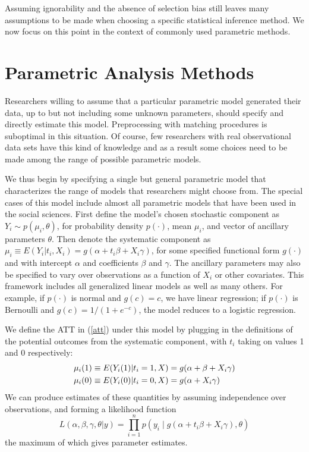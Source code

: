 \documentclass[11pt,titlepage]{article}
\begin{document}
Assuming ignorability and the absence of selection bias still leaves
many assumptions to be made when choosing a specific statistical
inference method.  We now focus on this point in the context of
commonly used parametric methods.

\section{Parametric Analysis Methods}

Researchers willing to assume that a particular parametric model
generated their data, up to but not including some unknown parameters,
should specify and directly estimate this model.  Preprocessing with
matching procedures is suboptimal in this situation.  Of course, few
researchers with real observational data sets have this kind of
knowledge and as a result some choices need to be made among the range
of possible parametric models.

We thus begin by specifying a single but general parametric model that
characterizes the range of models that researchers might choose from.
The special cases of this model include almost all parametric models
that have been used in the social sciences.  First define the model's
chosen stochastic component as $Y_i \sim p(\mu_i,\theta)$, for
probability density $p(\cdot)$, mean $\mu_i$, and vector of ancillary
parameters $\theta$.  Then denote the systematic component as
$\mu_i\equiv E(Y_i|t_i,X_i)=g(\alpha + t_i\beta + X_i\gamma)$, for
some specified functional form $g(\cdot)$ and with intercept $\alpha$
and coefficients $\beta$ and $\gamma$.  The ancillary parameters may
also be specified to vary over observations as a function of $X_i$ or
other covariates.  This framework includes all generalized linear
models \citep{McCNel89} as well as many others.  For example, if
$p(\cdot)$ is normal and $g(c)=c$, we have linear regression; if
$p(\cdot)$ is Bernoulli and $g(c)=1/(1+e^{-c})$, the model reduces to
a logistic regression.

We define the ATT in (\ref{att}) under this model by plugging in the
definitions of the potential outcomes from the systematic component,
with $t_i$ taking on values 1 and 0 respectively:
\begin{align}
  \label{matt}
\mu_i(1)&\equiv E(Y_i(1)|t_i=1,X)= g(\alpha + \beta + X_i\gamma)\notag \\
\mu_i(0)&\equiv E(Y_i(0)|t_i=0,X) = g(\alpha + X_i\gamma)
\end{align}
We can produce estimates of these quantities by assuming independence
over observations, and forming a likelihood function
\begin{equation}
  \label{lik}
  L(\alpha,\beta,\gamma,\theta|y) = \prod_{i=1}^n 
  p\left(y_i \mid g(\alpha + t_i\beta + X_i\gamma), \theta\right)
\end{equation}
the maximum of which gives parameter estimates.
\end{document}
